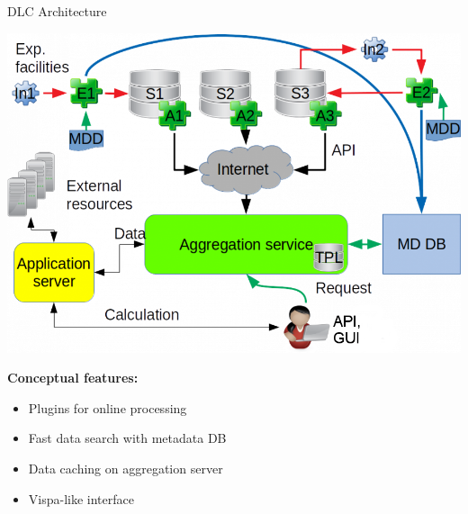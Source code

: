 \begin{frame}{DLC Architecture}
\begin{minipage}[c]{0.63\textwidth}
  \includegraphics[width=1\textwidth]{pics/arch_appds.png}
\end{minipage}
\hfill
\begin{minipage}[c]{0.33\textwidth}
  \textbf{Conceptual features:}
  \begin{itemize}
    \item Plugins for online processing
    \item Fast data search with metadata DB
    \item Data caching on aggregation server
    \item Vispa-like interface
  \end{itemize}
\end{minipage}
\end{frame}
